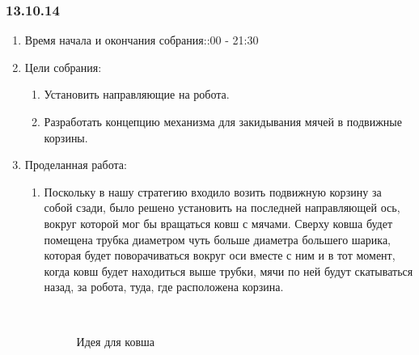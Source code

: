 
\subsubsection{13.10.14}

\begin{enumerate}
	\item Время начала и окончания собрания::00 - 21:30
	\item Цели собрания:\newline
	\begin{enumerate}
	  \item Установить направляющие на робота.\newline
	  
	  \item Разработать концепцию механизма для закидывания мячей в подвижные корзины.\newline
	  
    \end{enumerate}
	\item Проделанная работа:\newline
	\begin{enumerate}
	  \item Поскольку в нашу стратегию входило возить подвижную корзину за собой сзади, было решено установить на последней направляющей ось, вокруг которой мог бы вращаться ковш с мячами. Сверху ковша будет помещена трубка диаметром чуть больше диаметра большего шарика, которая будет поворачиваться вокруг оси вместе с ним и в тот момент, когда ковш будет находиться выше трубки, мячи по ней будут скатываться назад, за робота, туда, где расположена корзина.\newline
	  
	  \begin{figure}[H]
	  	\begin{minipage}[h]{0.2\linewidth}
	  		\center  
	  	\end{minipage}
	  	\begin{minipage}[h]{0.6\linewidth}
	  		\caption{Идея для ковша}
	  	\end{minipage}
	  \end{figure}
      

\end{enumerate}
\end{enumerate}
